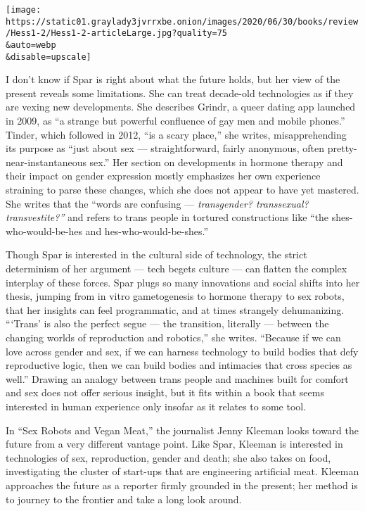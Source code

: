 \texttt{[image: https://static01.graylady3jvrrxbe.onion/images/2020/06/30/books/review/Hess1-2/Hess1-2-articleLarge.jpg?quality=75\\\&auto=webp\\\&disable=upscale]}

I don't know if Spar is right about what the future holds, but her view
of the present reveals some limitations. She can treat decade-old
technologies as if they are vexing new developments. She describes
Grindr, a queer dating app launched in 2009, as ``a strange but powerful
confluence of gay men and mobile phones.'' Tinder, which followed in
2012, ``is a scary place,'' she writes, misapprehending its purpose as
``just about sex --- straightforward, fairly anonymous, often
pretty-near-instantaneous sex.'' Her section on developments in hormone
therapy and their impact on gender expression mostly emphasizes her own
experience straining to parse these changes, which she does not appear
to have yet mastered. She writes that the ``words are confusing ---
\emph{transgender? transsexual? transvestite?''} and refers to trans
people in tortured constructions like ``the shes-who-would-be-hes and
hes-who-would-be-shes.''

Though Spar is interested in the cultural side of technology, the strict
determinism of her argument --- tech begets culture --- can flatten the
complex interplay of these forces. Spar plugs so many innovations and
social shifts into her thesis, jumping from in vitro gametogenesis to
hormone therapy to sex robots, that her insights can feel programmatic,
and at times strangely dehumanizing. ```Trans' is also the perfect segue
--- the transition, literally --- between the changing worlds of
reproduction and robotics,'' she writes. ``Because if we can love across
gender and sex, if we can harness technology to build bodies that defy
reproductive logic, then we can build bodies and intimacies that cross
species as well.'' Drawing an analogy between trans people and machines
built for comfort and sex does not offer serious insight, but it fits
within a book that seems interested in human experience only insofar as
it relates to some tool.

In ``Sex Robots and Vegan Meat,'' the journalist Jenny Kleeman looks
toward the future from a very different vantage point. Like Spar,
Kleeman is interested in technologies of sex, reproduction, gender and
death; she also takes on food, investigating the cluster of start-ups
that are engineering artificial meat. Kleeman approaches the future as a
reporter firmly grounded in the present; her method is to journey to the
frontier and take a long look around.

